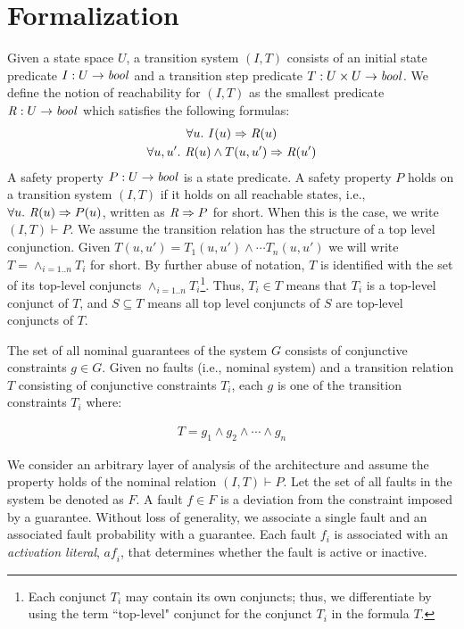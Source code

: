 \section{Formalization}
\label{sec:formalization}
Given a state space $U$, a transition system $(I,T)$ consists of an
initial state predicate $I : U \to \mathit{bool}$ and a transition step
predicate $T : U \times U \to \mathit{bool}$.
We define the notion of
reachability for $(I, T)$ as the smallest predicate $\mathit{R} : U \to
\mathit{bool}$ which satisfies the following formulas:
\begin{gather*}
  \forall u.~ I(u) \Rightarrow \mathit{R}(u) \\
  \forall u, u'.~ \mathit{R}(u) \land T(u, u') \Rightarrow \mathit{R}(u')
\end{gather*}
A safety property $P : U \to \mathit{bool}$ is a state predicate. A safety
property $P$ holds on a transition system $(I, T)$ if it holds on all
reachable states, i.e., $\forall u.~ \mathit{R}(u) \Rightarrow P(u)$,
written as $\mathit{R} \Rightarrow P$ for short. When this is the case, we
write $(I, T)\vdash P$. We assume the transition relation has the structure of a top level conjunction. Given $T(u, u') = T_1(u,u') \land \cdots T_n(u,u')$ we will write $T = \land_{i=1..n}T_i$ for short. By further abuse of notation, $T$ is identified with the set of its top-level conjuncts $\land_{i=1..n}T_i$\footnote{Each conjunct $T_i$ may contain its own conjuncts; thus, we differentiate by using the term ``top-level" conjunct for the conjunct $T_i$ in the formula $T$.}. Thus, $T_i \in T$ means that $T_i$ is a top-level conjunct of $T$, and $S\subseteq T$ means all top level conjuncts of $S$ are top-level conjuncts of $T$. %

The set of all nominal guarantees of the system $G$ consists of conjunctive constraints $g \in G$. Given no faults (i.e., nominal system) and a transition relation $T$ consisting of conjunctive constraints $T_i$, each $g$ is one of the transition constraints $T_i$ where:

\begin{gather}
T = g_1 \land  g_2 \land \cdots \land g_n
\label{eq:Tn}
\end{gather}

We consider an arbitrary layer of analysis of the architecture and assume the property holds of the nominal relation $(I,T) \vdash P$. Let the set of all faults in the system be  denoted as $F$. A fault $f \in F$ is a deviation from the constraint imposed by a guarantee. Without loss of generality, we associate a single fault and an associated fault probability with a guarantee. Each fault $f_i$ is associated with an \emph{activation literal}, $\mathit{af_i}$, that determines whether the fault is active or inactive. %

